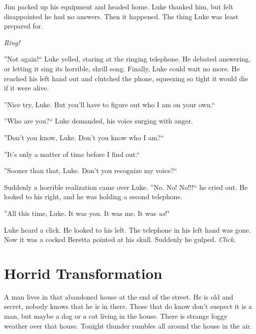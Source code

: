 Jim packed up his equipment and headed home. Luke thanked him, but
felt disappointed he had no answers. Then it happened. The thing
Luke was least prepared for.



{\em Ring!}



''Not again!`` Luke yelled, staring at the ringing telephone. He
debated answering, or letting it sing its horrible, shrill song.
Finally, Luke could wait no more. He reached his left hand out and
clutched the phone, squeezing so tight it would die if it were
alive.



''Nice try, Luke. But you'll have to figure out who I am on your
own.``



''Who are you?`` Luke demanded, his voice surging with anger.



''Don't you know, Luke. Don't you know who I am?``



''It's only a matter of time before I find out.``



''Sooner than that, Luke. Don't you recognize my voice?``



Suddenly a horrible realization came over Luke. ''No. No! No!!!`` he
cried out. He looked to his right, and he was holding a second
telephone.



''All this time, Luke. It was you. It was me. It was
{\em us}!"



Luke heard a click. He looked to his left. The telephone in his
left hand was gone. Now it was a cocked Beretta pointed at his
skull. Suddenly he gulped. {\em Click.} 

 





\chapter{Horrid Transformation}



A man lives in that abandoned house at the end of the street. He is
old and secret, nobody knows that he is in there. Those that do
know don't suspect it is a man, but maybe a dog or a cat living in
the house. There is strange foggy weather over that house. Tonight
thunder rumbles all around the house in the air.




